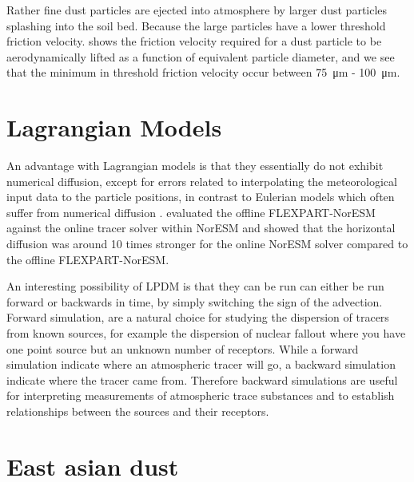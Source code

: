 Rather fine dust particles are ejected into atmosphere by larger dust particles splashing into the soil bed. Because the large particles have a  lower threshold friction velocity.  shows the friction velocity required for a dust particle to be aerodynamically lifted as a function of equivalent particle diameter, and we see that the minimum in threshold friction velocity occur between \SI{75}{\micro\metre} - \SI{100}{\micro\metre}.

\section{Lagrangian Models}
An advantage with Lagrangian models is that they essentially do not exhibit numerical diffusion, except for errors related to interpolating the meteorological input data to the particle positions, in contrast to Eulerian models which often suffer from numerical diffusion \parencite{cassiani_offline_2016}. \textcite{cassiani_offline_2016} evaluated the offline FLEXPART-NorESM against the online tracer solver within NorESM and showed that the horizontal diffusion was around 10 times stronger for the online NorESM solver compared to the offline FLEXPART-NorESM. 

An interesting possibility of LPDM is that they can be run can either be run forward or backwards in time, by simply switching the sign of the advection. Forward simulation, are a natural choice for studying the dispersion of tracers from known sources, for example the dispersion of nuclear fallout where you have one point source but an unknown number of receptors. While a forward simulation indicate where an atmospheric tracer will go, a backward simulation indicate where the tracer came from. Therefore backward simulations are useful for interpreting measurements of atmospheric trace substances and to establish relationships between the sources and their receptors.  



\section{East asian dust}

